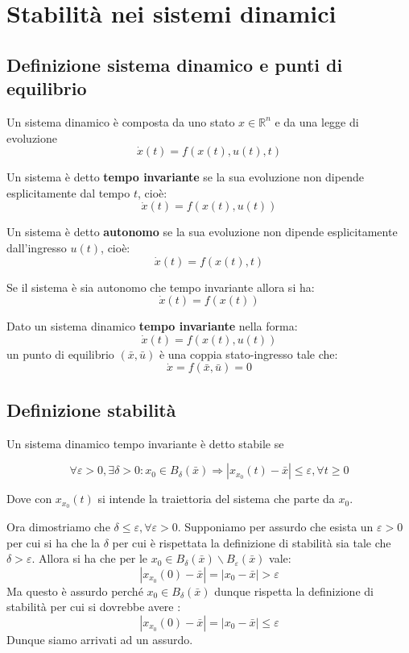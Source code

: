\chapter{Stabilità nei sistemi dinamici}


\section{Definizione sistema dinamico e punti di equilibrio}

Un sistema dinamico 
è composta da uno stato \(x \in \mathbb{R}^{n}\)
e da una legge di evoluzione
\[\dot{x}(t) = f(x(t), u(t), t)\]


\begin{definition}
Un sistema è detto \textbf{tempo invariante} se la
  sua evoluzione non dipende esplicitamente dal tempo \(t\), cioè:
  \[\dot{x}(t) = f(x(t), u(t))\]
\end{definition}


\begin{definition}
Un sistema è detto \textbf{autonomo} se la sua evoluzione non dipende esplicitamente
  dall'ingresso \(u(t)\), cioè:
  \[\dot{x}(t) = f(x(t),t)\]
\end{definition}


Se il sistema è sia autonomo che tempo invariante
allora si ha:
\[\dot{x}(t) = f(x(t))\]




\begin{definition}
Dato un sistema dinamico \textbf{tempo invariante} nella forma:
\[\dot{x}(t) = f(x(t), u(t))\]
un punto di equilibrio \((\bar{x}, \bar{u})\) è una coppia 
stato-ingresso tale che:
\[\dot{x} = f(\bar{x}, \bar{u}) = 0\]


\end{definition}



\section{Definizione stabilità}

Un sistema dinamico 
tempo invariante è detto stabile se 

\[\forall \varepsilon > 0, 
\exists \delta > 0 : x_{0} 
\in B_{\delta}(\bar{x})
\Rightarrow |x_{x_{0}}(t) - \bar{x}| \le \varepsilon, \forall t \geq 0\]

Dove con \(x_{x_{0}}(t)\) si intende 
la traiettoria del sistema 
che parte da \(x_{0}\).


Ora dimostriamo che \(\delta \le 
\varepsilon ,
\forall \varepsilon > 0\).
Supponiamo per assurdo che 
esista un \(\varepsilon >0 \)
per cui si ha  
che la \(\delta\)
per cui è rispettata la 
definizione di stabilità sia
tale che
\(\delta > \varepsilon\).
Allora si ha che per
le 
\(x_{0} \in B_{\delta}(\bar{x}) \backslash
B_{\varepsilon}(\bar{x})\)
vale:
\[|x_{x_{0}}(0) - \bar{x}| 
= \left|x_{0} -\bar{x}\right|> \varepsilon\]
Ma questo è assurdo perché
\(x_{0} 
\in B_{\delta}(\bar{x})\)
dunque rispetta la definizione 
di stabilità per cui
si dovrebbe avere :
\[|x_{x_{0}}(0) - \bar{x}| 
= \left|x_{0} - \bar{x}\right|
\le \varepsilon
\]
Dunque siamo arrivati ad un assurdo.

